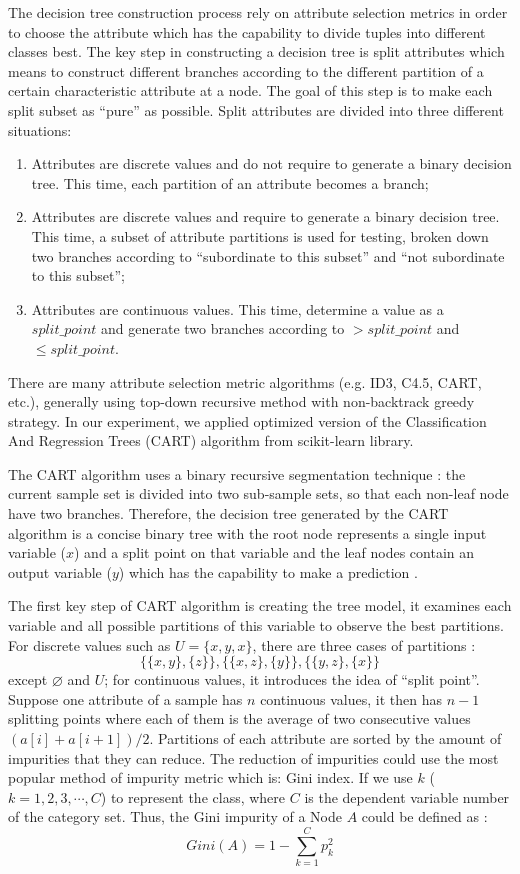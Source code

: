 \documentclass[sigconf]{acmart}
\begin{document}
The decision tree construction process rely on attribute selection metrics in order to choose the attribute which has the capability to divide tuples into different classes best. The key step in constructing a decision tree is split attributes which means to construct different branches according to the different partition of a certain characteristic attribute at a node. The goal of this step is to make each split subset as ``pure'' as possible. Split attributes are divided into three different situations:
\begin{enumerate}
    \item Attributes are discrete values and do not require to generate a binary decision tree. This time, each partition of an attribute becomes a branch;
    \item Attributes are discrete values and require to generate a binary decision tree. This time, a subset of attribute partitions is used for testing, broken down two branches according to ``subordinate to this subset'' and ``not subordinate to this subset'';
    \item Attributes are continuous values. This time, determine a value as a $split\_point$ and generate two branches according to $>split\_point$ and $\leq split\_point$.
\end{enumerate}

There are many attribute selection metric algorithms (e.g. ID3, C4.5, CART, etc.), generally using top-down recursive method with non-backtrack greedy strategy. In our experiment, we applied optimized version of the Classification And Regression Trees (CART) algorithm from scikit-learn library.

The CART algorithm uses a binary recursive segmentation technique \cite{cart}: the current sample set is divided into two sub-sample sets, so that each non-leaf node have two branches. Therefore, the decision tree generated by the CART algorithm is a concise binary tree with the root node represents a single input variable ($x$) and a split point on that variable and the leaf nodes contain an output variable ($y$) which has the capability to make a prediction \cite{cart}.

The first key step of CART algorithm is creating the tree model, it examines each variable and all possible partitions of this variable to observe the best partitions. For discrete values such as $U=\{x, y, x\}$, there are three cases of partitions \cite{sklearn.dt}:
\[
    \{\{x,y\},\{z\}\},\{\{x,z\},\{y\}\}, \{\{y,z\},\{x\}\}
\]
except $\varnothing$ and $U$; for continuous values, it introduces the idea of ``split point''. Suppose one attribute of a sample has $n$ continuous values, it then has $n-1$ splitting points where each of them is the average of two consecutive values $(a[i]+a[i+1])/2$. Partitions of each attribute are sorted by the amount of impurities that they can reduce. The reduction of impurities could use the most popular method of impurity metric which is: Gini index. If we use $k$ ($k= 1,2,3,\cdots, C$) to represent the class, where $C$ is the dependent variable number of the category set. Thus, the Gini impurity of a Node $A$ could be defined as \cite{sklearn.dt}:
\[
    Gini(A)=1-\sum_{k=1}^{C} p_{k}^2
\]
\end{document}
